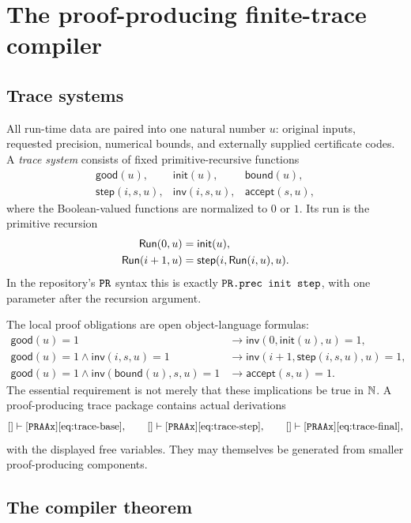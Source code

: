 \section{The proof-producing finite-trace compiler}
\label{sec:trace-compiler}

\subsection{Trace systems}

All run-time data are paired into one natural number \(u\): original inputs,
requested precision, numerical bounds, and externally supplied certificate
codes.  A \emph{trace system} consists of fixed primitive-recursive functions
\[
\begin{array}{lll}
 \mathsf{good}(u), & \mathsf{init}(u), & \mathsf{bound}(u),\\
 \mathsf{step}(i,s,u), & \mathsf{inv}(i,s,u), &
 \mathsf{accept}(s,u),
\end{array}
\]
where the Boolean-valued functions are normalized to \(0\) or \(1\).  Its run
is the primitive recursion
\begin{align*}
 \mathsf{Run}(0,u)&=\mathsf{init}(u),\\
 \mathsf{Run}(i+1,u)&=\mathsf{step}(i,\mathsf{Run}(i,u),u).
\end{align*}
In the repository's \(\texttt{PR}\) syntax this is exactly
\(\texttt{PR.prec init step}\), with one parameter after the recursion argument.

The local proof obligations are open object-language formulas:
\begin{align}
 \mathsf{good}(u)=1 &\to
   \mathsf{inv}(0,\mathsf{init}(u),u)=1,
   \tag{B}\label{eq:trace-base}\\
 \mathsf{good}(u)=1\wedge\mathsf{inv}(i,s,u)=1 &\to
   \mathsf{inv}(i+1,\mathsf{step}(i,s,u),u)=1,
   \tag{S}\label{eq:trace-step}\\
 \mathsf{good}(u)=1\wedge
   \mathsf{inv}(\mathsf{bound}(u),s,u)=1 &\to
   \mathsf{accept}(s,u)=1.
   \tag{F}\label{eq:trace-final}
\end{align}
The essential requirement is not merely that these implications be true in
\(\mathbb N\).  A proof-producing trace package contains actual derivations
\[
 []\vdash[\texttt{PRAAx}]\eqref{eq:trace-base},\qquad
 []\vdash[\texttt{PRAAx}]\eqref{eq:trace-step},\qquad
 []\vdash[\texttt{PRAAx}]\eqref{eq:trace-final},
\]
with the displayed free variables.  They may themselves be generated from
smaller proof-producing components.

\subsection{The compiler theorem}

